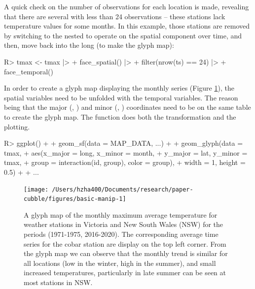 \documentclass[
  shortnames]{jss}
\begin{document}
A quick check on the number of observations for each location is made, revealing that there are several with less than 24 observations -- these stations lack temperature values for some months. In this example, those stations are removed by switching to the nested  to operate on the spatial component over time, and then, move back into the long  (to make the glyph map):

\begin{CodeChunk}
\begin{CodeInput}
R> tmax <- tmax |> 
+   face_spatial() |> 
+   filter(nrow(ts) == 24) |>
+   face_temporal()
\end{CodeInput}
\end{CodeChunk}

In order to create a glyph map displaying the monthly series (Figure \ref{fig:basic-manip}), the spatial variables need to be unfolded with the temporal variables. The reason being that the major (, ) and minor (, ) coordinates need to be on the same table to create the glyph map. The  function does both the transformation and the plotting.

\begin{CodeChunk}
\begin{CodeInput}
R> ggplot() +
+   geom_sf(data = MAP_DATA, ...) +
+   geom_glyph(data = tmax,
+              aes(x_major = long, x_minor = month,
+                  y_major = lat, y_minor = tmax,
+                  group = interaction(id, group), color = group),
+              width = 1, height = 0.5) + 
+   ...
\end{CodeInput}
\end{CodeChunk}

\begin{CodeChunk}
\begin{figure}

{\centering \texttt{[image: /Users/hzha400/Documents/research/paper-cubble/figures/basic-manip-1]} 

}

\caption[A glyph map of the monthly maximum average temperature for weather stations in  Victoria and New South Wales (NSW) for the periods (1971-1975, 2016-2020)]{A glyph map of the monthly maximum average temperature for weather stations in  Victoria and New South Wales (NSW) for the periods (1971-1975, 2016-2020). The corresponding average time series for the cobar station are display on the top left corner. From the glyph map we can observe that the monthly trend is similar for all locations (low in the winter, high in the summer), and small increased temperatures, particularly in late summer can be seen at most stations in NSW.}\label{fig:basic-manip}
\end{figure}
\end{CodeChunk}
\end{document}
